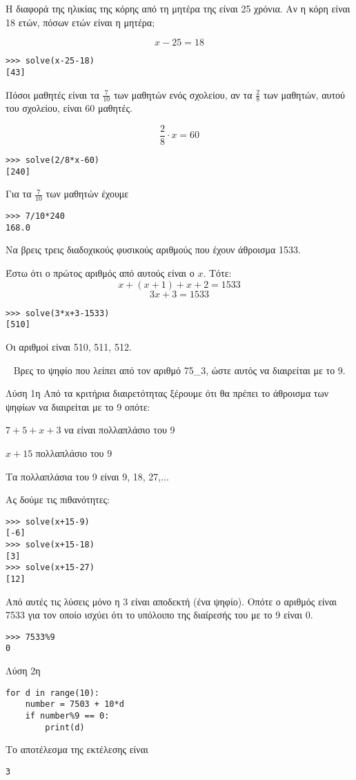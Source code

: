 \begin{exercise}
Η διαφορά της ηλικίας της κόρης από τη μητέρα της είναι 25 χρόνια.
Αν η κόρη είναι 18 ετών, πόσων ετών είναι η μητέρα;
\end{exercise}
$$x-25 = 18$$
\begin{lstlisting}
>>> solve(x-25-18)
[43]
\end{lstlisting}
\begin{exercise}
Πόσοι μαθητές είναι τα $\frac{7}{10}$ των μαθητών ενός σχολείου, αν τα $\frac{2}{8}$ των
μαθητών, αυτού του σχολείου, είναι $60$ μαθητές.
\end{exercise}
$$\frac{2}{8}\cdot x  =60$$
\begin{lstlisting}
>>> solve(2/8*x-60)
[240]
\end{lstlisting}
Για τα $\frac{7}{10}$ των μαθητών έχουμε
\begin{lstlisting}
>>> 7/10*240
168.0
\end{lstlisting}
\begin{exercise}
Να βρεις τρεις διαδοχικούς φυσικούς αριθμούς που έχουν άθροισμα 1533.
\end{exercise}
Έστω ότι ο πρώτος αριθμός από αυτούς είναι ο $x$. Τότε:
$$x+(x+1)+x+2 = 1533$$
$$3x+3 = 1533$$
\begin{lstlisting}
>>> solve(3*x+3-1533)
[510]
\end{lstlisting}
Οι αριθμοί είναι 510, 511, 512.
\begin{exercise}\
Βρες το ψηφίο που λείπει από τον αριθμό 75_3, ώστε αυτός να διαιρείται με το 9.
\end{exercise}
Λύση 1η
Από τα κριτήρια διαιρετότητας ξέρουμε ότι θα πρέπει το άθροισμα των ψηφίων να διαιρείται με το 9 οπότε:

$7+5+x+3$ να είναι πολλαπλάσιο του 9

$x+15$ πολλαπλάσιο του 9 

Τα πολλαπλάσια του 9 είναι 9, 18, 27,...

Ας δούμε τις πιθανότητες:

\begin{lstlisting}
>>> solve(x+15-9)
[-6]
>>> solve(x+15-18)
[3]
>>> solve(x+15-27)
[12]
\end{lstlisting}
Από αυτές τις λύσεις μόνο η 3 είναι αποδεκτή (ένα ψηφίο). Οπότε ο αριθμός είναι 7533 για τον οποίο ισχύει ότι το υπόλοιπο της διαίρεσής του με το 9 είναι 0.
\begin{lstlisting}
>>> 7533%9
0
\end{lstlisting}
Λύση 2η
\begin{lstlisting}
for d in range(10):
    number = 7503 + 10*d
    if number%9 == 0:
        print(d)
\end{lstlisting}
Το αποτέλεσμα της εκτέλεσης είναι
\begin{lstlisting}
3
\end{lstlisting}

